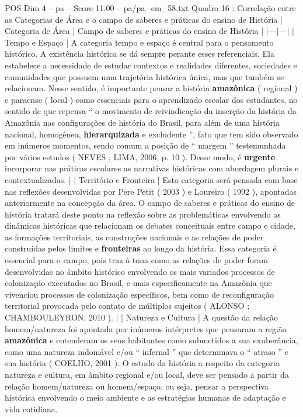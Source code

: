 \begin{textsample}{POS Dim 4 – pa – Score 11.00 – pa/pa\_em\_58.txt}  \label{ex:f4_pos_018}
Quadro 16 : Correlação entre as Categorias de Área e o campo de saberes e práticas do ensino de História | Categoria de Área | Campo de saberes e práticas do ensino de História | |---|---| | Tempo e Espaço | A categoria tempo e espaço é central para o pensamento histórico.
A existência histórica se dá sempre perante esses referenciais.
Ela estabelece a necessidade de estudar contextos e realidades diferentes, sociedades e comunidades que possuem uma trajetória histórica única, mas que também se relacionam.
Nesse sentido, é importante pensar a história \textbf{amazônica} ( regional ) e paraense ( local ) como essenciais para o aprendizado escolar dos estudantes, no sentido de que repensa “ o movimento de reivindicação da inserção da história da Amazônia nas configurações de história do Brasil, para além de uma história nacional, homogênea, \textbf{hierarquizada} e excludente ”, fato que tem sido observado em inúmeros momentos, sendo comum a posição de “ margem ” testemunhada por vários estudos ( NEVES ; LIMA, 2006, p. 10 ).
Desse modo, é \textbf{urgente} incorporar nas práticas escolares as narrativas históricas com abordagem plurais e contextualizadas. | | Território e Fronteira | Esta categoria será pensada com base nas reflexões desenvolvidas por Pere Petit ( 2003 ) e Loureiro ( 1992 ), apontadas anteriormente na concepção da área.
O campo de saberes e práticas do ensino de história tratará deste ponto na reflexão sobre as problemáticas envolvendo as dinâmicas históricas que relacionam os debates conceituais entre campo e cidade, as formações territoriais, as construções nacionais e as relações de poder construídas pelos limites e \textbf{fronteiras} ao longo da história.
Essa categoria é essencial para o campo, pois traz à tona como as relações de poder foram desenvolvidas no âmbito histórico envolvendo os mais variados processos de colonização executados no Brasil, e mais especificamente na Amazônia que vivenciou processos de colonização específicos, bem como de reconfiguração territorial provocada pelo contato de múltiplos sujeitos ( ALONSO ; CHAMBOULEYRON, 2010 ). | | Natureza e Cultura | A questão da relação homem/natureza foi apontada por inúmeros intérpretes que pensaram a região \textbf{amazônica} e entenderam os seus habitantes como submetidos a sua exuberância, como uma natureza indomável e/ou “ infernal ” que determinava o “ atraso ” e sua história ( COELHO, 2001 ).
O estudo da história a respeito da categoria natureza e cultura, em âmbito regional e/ou local, deve ser pensado a partir da relação homem/natureza ou homem/espaço, ou seja, pensar a perspectiva histórica envolvendo o meio ambiente e as estratégias humanas de adaptação e vida cotidiana.

\end{textsample}

